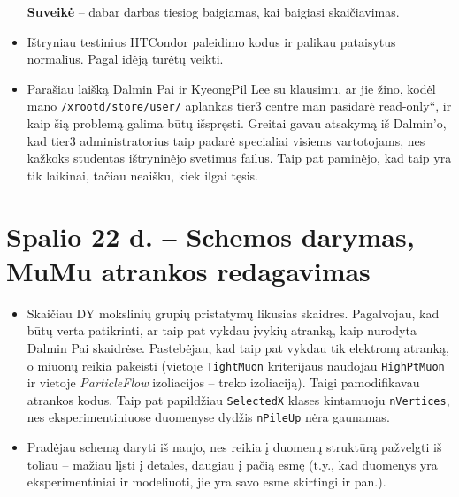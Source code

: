 \documentclass[a4paper, 12pt]{article}
\newcommand{\ltq}[1]{{\quotedblbase{}#1\textquotedblleft{}}}
\newcommand{\ttt}[1]{\texttt{#1}}
\begin{document}
\begin{itemize}
	\textbf{Suveikė} -- dabar darbas tiesiog baigiamas, kai baigiasi skaičiavimas.
	\item Ištryniau testinius HTCondor paleidimo kodus ir palikau pataisytus
	normalius. Pagal idėją turėtų veikti.
	\item Parašiau laišką Dalmin Pai ir KyeongPil Lee su klausimu, ar jie žino,
	kodėl mano \ttt{/xrootd/store/user/} aplankas tier3 centre man pasidarė
	\ltq{read-only}, ir kaip šią problemą galima būtų išspręsti. Greitai gavau
	atsakymą iš Dalmin'o, kad tier3 administratorius taip padarė specialiai visiems
	vartotojams, nes kažkoks studentas ištryninėjo svetimus failus. Taip pat paminėjo,
	kad taip yra tik laikinai, tačiau neaišku, kiek ilgai tęsis.
\end{itemize}

\section{Spalio 22 d. -- Schemos darymas, MuMu atrankos redagavimas}
\begin{itemize}
	\item Skaičiau DY mokslinių grupių pristatymų likusias skaidres. Pagalvojau,
	kad būtų verta patikrinti, ar taip pat vykdau įvykių atranką, kaip nurodyta
	Dalmin Pai skaidrėse. Pastebėjau, kad taip pat vykdau tik elektronų atranką,
	o miuonų reikia pakeisti (vietoje \ttt{TightMuon} kriterijaus naudojau
	\ttt{HighPtMuon} ir vietoje \textit{ParticleFlow} izoliacijos -- treko izoliaciją).
	Taigi pamodifikavau atrankos kodus. Taip pat papildžiau \ttt{SelectedX} klases
	kintamuoju \ttt{nVertices}, nes eksperimentiniuose duomenyse dydžis \ttt{nPileUp}
	nėra gaunamas.
	\item Pradėjau schemą daryti iš naujo, nes reikia į duomenų struktūrą pažvelgti
	iš toliau -- mažiau lįsti į detales, daugiau į pačią esmę (t.y., kad duomenys yra
	eksperimentiniai ir modeliuoti, jie yra savo esme skirtingi ir pan.).
\end{itemize}
\end{document}
